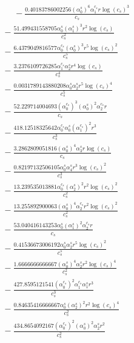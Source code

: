 \documentclass[10pt]{article}
\begin{document}
\begin{align*}
\phantom{R_{3,9}} &\phantom{={}}{}  - \frac{0.40183786002256 \left(\alpha_{0}^s\right)^{6} \alpha_{1}^{c_s} r \log{\left(c_{s} \right)}^{3}}{c_{s}} \\
&{}  - \frac{51.499431558705 \alpha_{0}^s \left(\alpha_{1}^s\right)^{3} r^{2} \log{\left(c_{s} \right)}}{c_{s}^{2}} \\
&{}  - \frac{6.4379049816577 \alpha_{0}^{c_s} \left(\alpha_{0}^s\right)^{3} r^{5} \log{\left(c_{s} \right)}^{2}}{c_{s}^{5}} \\
&{}  - \frac{3.2376109726285 \alpha_{1}^{c_s} \alpha_{2}^s r^{4} \log{\left(c_{s} \right)}}{c_{s}^{4}} \\
&{}  - \frac{0.0031789143880208 \alpha_{0}^s \alpha_{2}^s r^{5} \log{\left(c_{s} \right)}^{4}}{c_{s}^{5}} \\
&{}  - \frac{52.229714004693 \left(\alpha_{0}^{c_s}\right)^{3} \left(\alpha_{0}^s\right)^{2} \alpha_{2}^{c_s} r}{c_{s}} \\
&{}  - \frac{418.12518325642 \alpha_{0}^{c_s} \alpha_{0}^s \left(\alpha_{1}^{c_s}\right)^{2} r^{3}}{c_{s}^{3}} \\
&{}  - \frac{3.2862809051816 \left(\alpha_{0}^s\right)^{4} \alpha_{3}^s r \log{\left(c_{s} \right)}}{c_{s}} \\
&{}  - \frac{0.82197132506105 \alpha_{0}^s \alpha_{4}^s r^{3} \log{\left(c_{s} \right)}^{2}}{c_{s}^{3}} \\
&{}  - \frac{13.239535013881 \alpha_{0}^{c_s} \left(\alpha_{2}^s\right)^{2} r^{2} \log{\left(c_{s} \right)}^{2}}{c_{s}^{2}} \\
&{}  - \frac{13.255892900063 \left(\alpha_{0}^s\right)^{4} \alpha_{2}^{c_s} r^{2} \log{\left(c_{s} \right)}^{2}}{c_{s}^{2}} \\
&{}  - \frac{53.040416143253 \alpha_{0}^s \left(\alpha_{1}^s\right)^{2} \alpha_{2}^{c_s} r}{c_{s}} \\
&{}  - \frac{0.41536673006192 \alpha_{0}^s \alpha_{2}^s r^{5} \log{\left(c_{s} \right)}^{2}}{c_{s}^{5}} \\
&{}  - \frac{1.6666666666667 \left(\alpha_{0}^s\right)^{4} \alpha_{2}^s r^{2} \log{\left(c_{s} \right)}^{4}}{c_{s}^{2}} \\
&{}  - \frac{427.8595121541 \left(\alpha_{0}^{c_s}\right)^{2} \alpha_{1}^{c_s} \alpha_{1}^s r^{3}}{c_{s}^{3}} \\
&{}  - \frac{0.84635416666667 \alpha_{0}^s \left(\alpha_{2}^s\right)^{2} r^{2} \log{\left(c_{s} \right)}^{4}}{c_{s}^{2}} \\
&{}  - \frac{434.8654092167 \left(\alpha_{0}^{c_s}\right)^{2} \left(\alpha_{0}^s\right)^{2} \alpha_{2}^s r^{2}}{c_{s}^{2}} \\

\end{align*}
\end{document}
